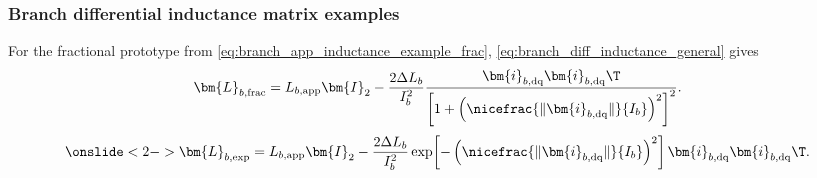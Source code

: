\begin{frame}
    \frametitle{Branch differential inductance matrix examples}
    For the fractional prototype from \eqref{eq:branch_app_inductance_example_frac}, \eqref{eq:branch_diff_inductance_general} gives
    \begin{equation}
        \bm{L}_{b,\mathrm{frac}}
        =L_{b,\mathrm{app}}\bm{I}_2
        -\frac{2\Delta L_b}{I_b^2}
        \frac{\bm{i}_{b,\mathrm{dq}}\bm{i}_{b,\mathrm{dq}}\T}
        {\left[1+\left(\nicefrac{\|\bm{i}_{b,\mathrm{dq}}\|}{I_b}\right)^2\right]^2}.
        \label{eq:branch_frac_diff_inductance_matrix}
    \end{equation}
    \begin{equation}
        \onslide<2->{\bm{L}_{b,\mathrm{exp}}
                =L_{b,\mathrm{app}}\bm{I}_2
                -\frac{2\Delta L_b}{I_b^2}
                \exp\!\left[-\left(\nicefrac{\|\bm{i}_{b,\mathrm{dq}}\|}{I_b}\right)^2\right]
                \bm{i}_{b,\mathrm{dq}}\bm{i}_{b,\mathrm{dq}}\T.}
        \label{eq:branch_exp_diff_inductance_matrix}
    \end{equation}
\end{frame}


